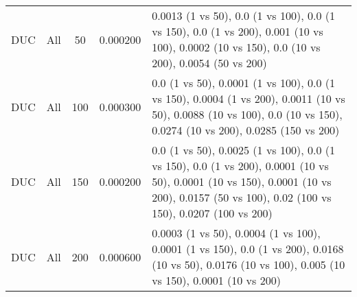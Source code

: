 \begin{tabular}{|l|c|c|c|p{7cm}|}
DUC & All & 50 & 0.000200 & 0.0013 (1 vs 50), 0.0 (1 vs 100), 0.0 (1 vs 150), 0.0 (1 vs 200), 0.001 (10 vs 100), 0.0002 (10 vs 150), 0.0 (10 vs 200), 0.0054 (50 vs 200) \\
DUC & All & 100 & 0.000300 & 0.0 (1 vs 50), 0.0001 (1 vs 100), 0.0 (1 vs 150), 0.0004 (1 vs 200), 0.0011 (10 vs 50), 0.0088 (10 vs 100), 0.0 (10 vs 150), 0.0274 (10 vs 200), 0.0285 (150 vs 200) \\
DUC & All & 150 & 0.000200 & 0.0 (1 vs 50), 0.0025 (1 vs 100), 0.0 (1 vs 150), 0.0 (1 vs 200), 0.0001 (10 vs 50), 0.0001 (10 vs 150), 0.0001 (10 vs 200), 0.0157 (50 vs 100), 0.02 (100 vs 150), 0.0207 (100 vs 200) \\
DUC & All & 200 & 0.000600 & 0.0003 (1 vs 50), 0.0004 (1 vs 100), 0.0001 (1 vs 150), 0.0 (1 vs 200), 0.0168 (10 vs 50), 0.0176 (10 vs 100), 0.005 (10 vs 150), 0.0001 (10 vs 200) \\
\bottomrule
\end{tabular}
